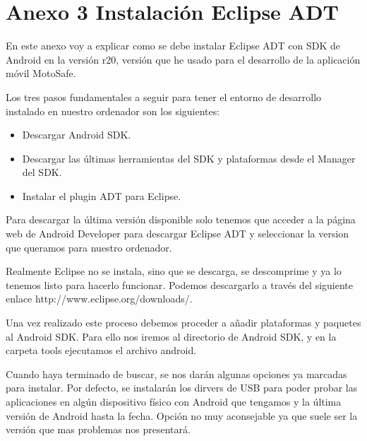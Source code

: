 	\chapter*{Anexo 3 Instalación Eclipse ADT} %
	
		En este anexo voy a explicar como se debe instalar Eclipse ADT con SDK de Android en la versión r20, versión que he usado para el desarrollo de la aplicación móvil MotoSafe.
		
		Los tres pasos fundamentales a seguir para tener el entorno de desarrollo instalado en nuestro ordenador son los siguientes:
		
		\begin{itemize}	
			
			\item Descargar Android SDK.
			
			\item Descargar las últimas herramientas del SDK y plataformas desde el Manager del SDK.
			
			\item Instalar el plugin ADT para Eclipse.
			
		\end{itemize}
		
		Para descargar la última versión disponible solo tenemos que acceder a la página web de Android Developer para descargar Eclipse ADT y seleccionar la version que queramos para nuestro ordenador.
		
		Realmente Eclipse no se instala, sino que se descarga, se descomprime y ya lo tenemos listo para hacerlo funcionar. Podemos descargarlo a través del siguiente enlace http://www.eclipse.org/downloads/.
		
		Una vez realizado este proceso debemos proceder a añadir plataformas y paquetes al Android SDK. Para ello nos iremos al directorio de Android SDK, y en la carpeta tools ejecutamos el archivo android.
		
		Cuando haya terminado de buscar, se nos darán algunas opciones ya marcadas para instalar. Por defecto, se instalarán los dirvers de USB para poder probar las aplicaciones en algún dispositivo físico con Android que tengamos y la última versión de Android hasta la fecha. Opción no muy aconsejable ya que suele ser la versión que mas problemas nos presentará.
		
